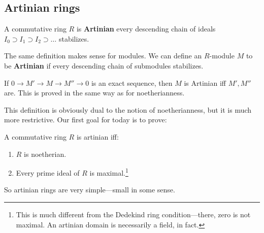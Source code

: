 \subsection{Artinian rings}

\begin{definition} 
A commutative ring $R$ is \textbf{Artinian} every descending chain of ideals
$I_0 \supset I_1 \supset I_2 \supset \dots$
stabilizes.
\end{definition} 

\begin{remark} 
The same definition makes sense for modules. We can define an $R$-module $M$ to
be \textbf{Artinian} if every descending chain of submodules stabilizes. 
\end{remark} 

\begin{remark} 
If $0 \to M' \to M \to M'' \to 0$ is an exact sequence, then $M$ is Artinian
iff $M', M''$ are. This is proved in the same way as for noetherianness.
\end{remark} 

This definition is obviously dual to the notion of noetherianness, but it is
much more restrictive.  
Our first goal for today is to prove:

\begin{theorem} 
A commutative ring $R$ is artinian iff:
\begin{enumerate}
\item $R$ is noetherian. 
\item Every prime ideal of $R$ is maximal.\footnote{This is much different from
the Dedekind ring condition---there, zero is not maximal. An artinian domain is
necessarily a field, in fact.}
\end{enumerate}
\end{theorem} 


So artinian rings are very simple---small in some sense.


